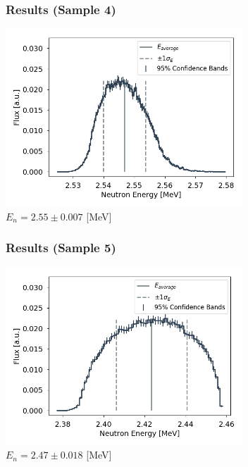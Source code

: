 \documentclass[12pt,xcolor=dvipsnames]{beamer}
\DeclareMathOperator\erfc{erfc}
\begin{document}
\begin{frame}
\frametitle{Results (Sample 4)}
\centering
\includegraphics[width=3.5in]{3609False.png}\\
$E_n=2.55\pm 0.007$ [MeV]
\end{frame}

\begin{frame}
\frametitle{Results (Sample 5)}
\centering
\includegraphics[width=3.5in]{-7046True.png}\\
$E_n=2.47\pm 0.018$ [MeV]
\end{frame}


\end{document}
